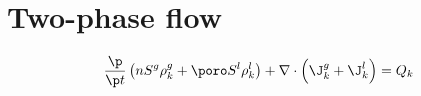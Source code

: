 \section{Two-phase flow}

\begin{align}
\frac{\p}{\p t}
\left(n S^g \rho_k^g +\poro S^l \rho_k^l \right)
+
\nabla\cdot
\left(\J_k^g+\J_k^l\right)
=
Q_k
\label{eqn:}
\end{align}